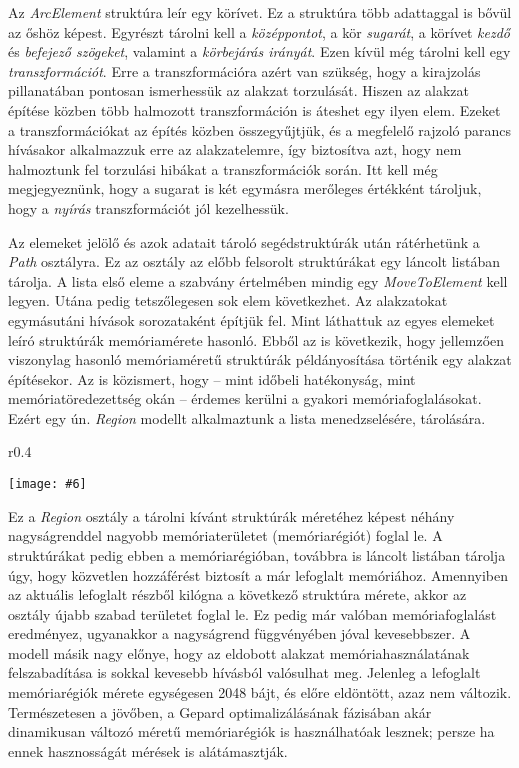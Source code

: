 \documentclass[12pt]{report}
\makeatletter
\theoremstyle{definition}
\newcommand{\func}[1]{{\textsl{#1}}}
\newcommand{\melyikoldalra}{r}
\newlength{\Xoffset}
\newlength{\Yoffset}
\newcommand*{\setpdfoffset}[2]{%
  \setlength{\Xoffset}{#1}%
  \setlength{\Yoffset}{#2}%
}
\newcommand*{\setviewport}[4]{%
  \def\x@viewport{%
    {\the\dimexpr#1-\Xoffset}
    {\the\dimexpr#2-\Yoffset}
    {\the\dimexpr#3-\Xoffset}
    {\the\dimexpr#4-\Yoffset}%
  }%
}
\newcommand{\includegraphicskivagas}[6]{
    \setpdfoffset{0pt}{0pt}
    \setviewport{#1}{#2}{#3}{#4}
    \texttt{[image: \#6]}
}
\newcommand{\includedataflowkivagas}[5]{
    \includegraphicskivagas{#1}{#2}{#3}{#4}{scale=0.6,#5}
    {img/built/dataflow_eps}
}
\makeatother
\begin{document}
Az \func{ArcElement} struktúra leír egy körívet. Ez a struktúra több adattaggal
is bővül az őshöz képest. Egyrészt tárolni kell a \emph{középpontot}, a kör
\emph{sugarát}, a körívet \emph{kezdő} és \emph{befejező szögeket}, valamint a
\emph{körbejárás irányát}. Ezen kívül még tárolni kell egy
\emph{transzformációt}. Erre a transzformációra azért van szükség, hogy a
kirajzolás pillanatában pontosan ismerhessük az alakzat torzulását. Hiszen az
alakzat építése közben több halmozott transzformáción is áteshet egy ilyen
elem. Ezeket a transzformációkat az építés közben összegyűjtjük, és a megfelelő
rajzoló parancs hívásakor alkalmazzuk erre az alakzatelemre, így biztosítva azt,
hogy nem halmoztunk fel torzulási hibákat a transzformációk során. Itt kell még
megjegyeznünk, hogy a sugarat is két egymásra merőleges értékként tároljuk,
hogy a \emph{nyírás} transzformációt jól kezelhessük.

Az elemeket jelölő és azok adatait tároló segédstruktúrák után rátérhetünk a
\func{Path} osztályra. Ez az osztály az előbb felsorolt struktúrákat egy
láncolt listában tárolja. A lista első eleme a szabvány értelmében mindig egy
\func{MoveToElement} kell legyen. Utána pedig tetszőlegesen sok elem
következhet. Az alakzatokat egymásutáni hívások sorozataként építjük fel. Mint
láthattuk az egyes elemeket leíró struktúrák memóriamérete hasonló. Ebből az is
következik, hogy jellemzően viszonylag hasonló memóriaméretű struktúrák
példányosítása történik egy alakzat építésekor. Az is közismert, hogy -- mint
időbeli hatékonyság, mint memóriatöredezettség okán -- érdemes kerülni a gyakori
memóriafoglalásokat. Ezért egy ún. \emph{Region} modellt alkalmaztunk a lista
menedzselésére, tárolására.

  \begin{wrapfigure}{\melyikoldalra}{0.4\textwidth}
    \begin{center}
      \includedataflowkivagas{153pt}{355pt}{345pt}{595pt}{}
    \end{center}
    \caption{\label{fig:dataflow-path} A belső Path API részei \\ (Részlet
    \az+\emph{\ref{appendix:dataflow}. folyamatábrából}.)}
  \end{wrapfigure}

Ez a \func{Region} osztály a tárolni kívánt struktúrák méretéhez képest néhány
nagyságrenddel nagyobb memóriaterületet (memóriarégiót) foglal le. A
struktúrákat pedig ebben a memóriarégióban, továbbra is láncolt listában
tárolja úgy, hogy közvetlen hozzáférést biztosít a már lefoglalt memóriához.
Amennyiben az aktuális lefoglalt részből kilógna a következő struktúra mérete,
akkor az osztály újabb szabad területet foglal le. Ez pedig már valóban
memóriafoglalást eredményez, ugyanakkor a nagyságrend függvényében jóval
kevesebbszer. A modell másik nagy előnye, hogy az eldobott alakzat
memóriahasználatának felszabadítása is sokkal kevesebb hívásból valósulhat meg.
Jelenleg a lefoglalt memóriarégiók mérete egységesen 2048 bájt, és előre
eldöntött, azaz nem változik. Természetesen a jövőben, a Gepard
optimalizálásának fázisában akár dinamikusan változó méretű memóriarégiók is
használhatóak lesznek; persze ha ennek hasznosságát mérések is alátámasztják.
\end{document}
